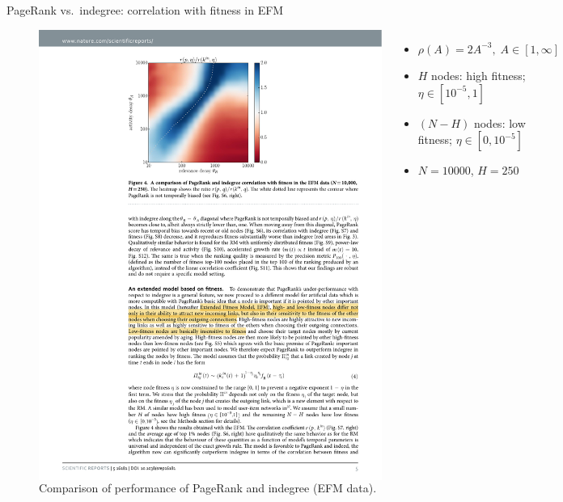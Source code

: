 \begin{frame}{PageRank vs.\ indegree: correlation with fitness in EFM}
    \begin{figure}
        \begin{columns}

            \includegraphics[width=1.0\textwidth]{figures/PageRankEFM_heatmap}

            \begin{footnotesize}
            \begin{itemize}
                \item $\rho(A) = 2A^{-3}, \; A \in [1, \infty]$
                \item $H$ nodes: high fitness; $\eta \in [10^{-5}, 1]$
                \item $(N-H)$ nodes: low fitness; $\eta \in [0, 10^{-5}]$
                \item $N=10000$, $H=250$
            \end{itemize}
            \end{footnotesize}
        \end{columns}
        \caption{Comparison of performance of PageRank and indegree (EFM data).}
    \end{figure}
\end{frame}

